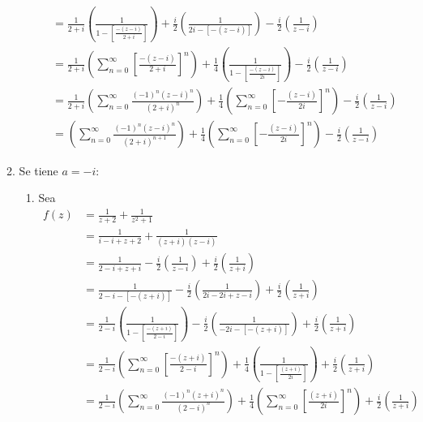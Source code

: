 \begin{problema}
\begin{enumerate}
\begin{sol}
\begin{enumerate}
\begin{enumerate}
\begin{align*}
                             &= \frac{1}{2+i}\left(\frac{1}{1-\left[\frac{-(z-i)}{2+i}\right]}\right)+\frac{i}{2}\left(\frac{1}{2i -\left[-(z-i)\right]}\right)-\frac{i}{2}\left(\frac{1}{z-i}\right)\\
                             &= \frac{1}{2+i}\left(\sum_{n=0}^\infty \left[\frac{-(z-i)}{2+i}\right]^n\right)+\frac{1}{4}\left(\frac{1}{1 -\left[\frac{-(z-i)}{2i}\right]}\right)-\frac{i}{2}\left(\frac{1}{z-i}\right)\\
                             &= \frac{1}{2+i}\left(\sum_{n=0}^\infty \frac{(-1)^n(z-i)^n}{(2+i)^n}\right)+\frac{1}{4}\left(\sum_{n=0}^\infty \left[-\frac{(z-i)}{2i}\right]^n\right)-\frac{i}{2}\left(\frac{1}{z-i}\right)\\
                             &= \left(\sum_{n=0}^\infty \frac{(-1)^n(z-i)^n}{(2+i)^{n+1}}\right)+\frac{1}{4}\left(\sum_{n=0}^\infty \left[-\frac{(z-i)}{2i}\right]^n\right)-\frac{i}{2}\left(\frac{1}{z-i}\right)
                            \end{align*}
                \end{enumerate}
                \item Se tiene $a=-i$:
                \begin{enumerate}
                    \item Sea 
                    \begin{align*}
                        f(z) &= \frac{1}{z+2}+\frac{1}{z^2+1}\\
                             &= \frac{1}{i-i+z+2}+\frac{1}{(z+i)(z-i)}\\
                             &= \frac{1}{2-i+z+i}-\frac{i}{2}\left(\frac{1}{z-i}\right)+\frac{i}{2}\left(\frac{1}{z+i}\right)\\
                             &= \frac{1}{2-i-[-(z+i)]}-\frac{i}{2}\left(\frac{1}{2i-2i+z-i}\right)+\frac{i}{2}\left(\frac{1}{z+i}\right)\\
                             &= \frac{1}{2-i}\left(\frac{1}{1-\left[\frac{-(z+i)}{2-i}\right]}\right)-\frac{i}{2}\left(\frac{1}{-2i -\left[-(z+i)\right]}\right)+\frac{i}{2}\left(\frac{1}{z+i}\right)\\
                             &= \frac{1}{2-i}\left(\sum_{n=0}^\infty \left[\frac{-(z+i)}{2-i}\right]^n\right)+\frac{1}{4}\left(\frac{1}{1 -\left[\frac{(z+i)}{2i}\right]}\right)+\frac{i}{2}\left(\frac{1}{z+i}\right)\\
                             &= \frac{1}{2-i}\left(\sum_{n=0}^\infty \frac{(-1)^n(z+i)^n}{(2- i)^n}\right)+\frac{1}{4}\left(\sum_{n=0}^\infty \left[\frac{(z+i)}{2i}\right]^n\right)+\frac{i}{2}\left(\frac{1}{z+i}\right)\\

\end{align*}
\end{enumerate}
\end{enumerate}
\end{sol}
\end{enumerate}
\end{problema}
